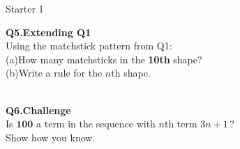 \documentclass{beamer}
\newcommand{\ashow}[1]{\uncover<2->{\textcolor{red}{\small #1}}}
\begin{document}
\begin{frame}[shrink=5]{Starter 1}
  \begin{minipage}[t]{0.48\textwidth}
    \small\textbf{Q5.\enspace Extending Q1}\\
    \footnotesize
    Using the matchstick pattern from Q1:\\
    (a)\;How many matchsticks in the \textbf{10th} shape?\\
    (b)\;Write a rule for the $n$th shape.\\[0.2em]
    \ashow{(a)\;31 matchsticks.}\\
    \ashow{(b)\;position-to-term rule:\;$3n+1$}
  \end{minipage}\hfill
  \begin{minipage}[t]{0.48\textwidth}
    \small\textbf{Q6.\;Challenge}\\
    \footnotesize
    Is $\boldsymbol{100}$ a term in the sequence
    with $n$th term $3n+1$\,?\\
    Show how you know.\\[0.2em]
    \ashow{Yes, when $n=33$,}\\
    \ashow{$3n+1=3\times33+1=99+1=100$}
  \end{minipage}

\end{frame}
\end{document}
